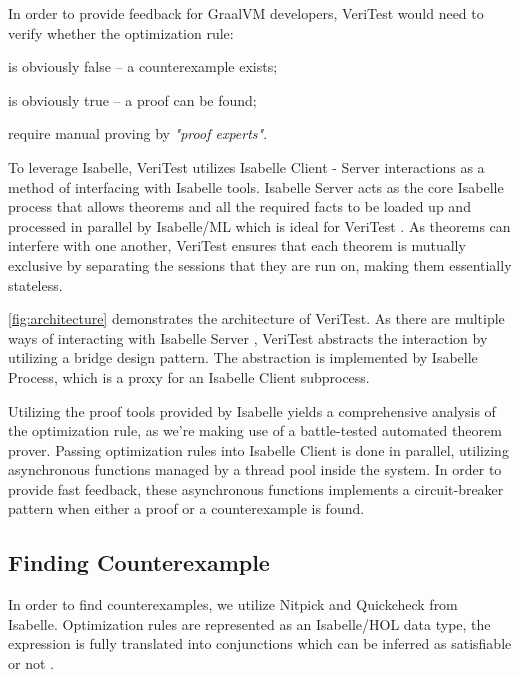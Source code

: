 \documentclass[conference,a4paper,english,10pt]{IEEEtran}[2015/08/26]
\begin{document}
In order to provide feedback for GraalVM developers, VeriTest would need to verify whether the optimization rule:
\begin{inparaenum}
  \item is obviously false -- a counterexample exists;
  \item is obviously true -- a proof can be found;
  \item require manual proving by \emph{"proof experts"}.
\end{inparaenum}

To leverage Isabelle, VeriTest utilizes Isabelle Client - Server \cite{isabelleSystem} interactions as a method of interfacing with 
Isabelle tools. Isabelle Server acts as the core Isabelle process that allows theorems and all the required facts to 
be loaded up and processed in parallel by Isabelle/ML which is ideal for VeriTest \cite[Ch. 4.2.6]{isabelleSystem}. 
As theorems can interfere with one another, VeriTest ensures that each theorem is 
mutually exclusive by separating the sessions that they are run on, making them essentially stateless.

\cref{fig:architecture} demonstrates the architecture of VeriTest. As there are multiple ways of interacting with Isabelle Server 
\cite[Ch. 4.2]{isabelleSystem}, VeriTest abstracts the interaction by utilizing a bridge design pattern. The abstraction is implemented by 
Isabelle Process, which is a proxy for an Isabelle Client subprocess. 

Utilizing the proof tools provided by Isabelle yields a comprehensive analysis of the optimization rule, as we're making use of a battle-tested 
automated theorem prover. Passing optimization rules into Isabelle Client is done in parallel, utilizing asynchronous functions managed 
by a thread pool inside the system. In order to provide fast feedback, these asynchronous functions implements a circuit-breaker pattern 
when either a proof or a counterexample is found.

\subsection{Finding Counterexample}
\label{sec:findcounterexample}

In order to find counterexamples, we utilize Nitpick and Quickcheck from Isabelle. Optimization rules are represented as an Isabelle/HOL 
data type, the expression is fully translated into conjunctions which can be inferred as satisfiable or not \cite[Sec. 2]{Term_Graph_Optimizations}.
\end{document}
